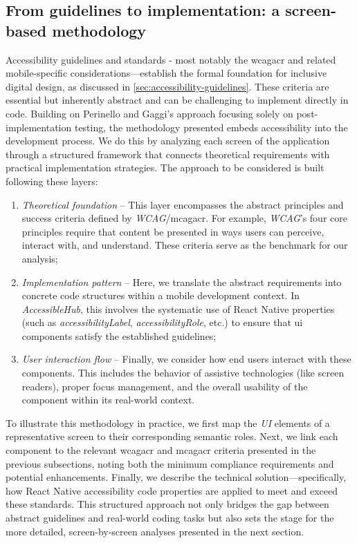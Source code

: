 \subsection{From guidelines to implementation: a screen-based methodology}
\label{sec:accessiblehub-screen-methodology}

Accessibility guidelines and standards - most notably the \acrshort{wcagacr}  and related mobile-specific considerations—establish the formal foundation for inclusive digital design, as discussed in \ref{sec:accessibility-guidelines}. These criteria are essential but inherently abstract and can be challenging to implement directly in code. Building on Perinello and Gaggi's approach focusing solely on post-implementation testing, the methodology presented embeds accessibility into the development process. We do this by analyzing each screen of the application through a structured framework that connects theoretical requirements with practical implementation strategies. The approach to be considered is built following these layers:

\begin{enumerate}
    \item \textit{Theoretical foundation} – This layer encompasses the abstract principles and success criteria defined by \textit{WCAG}/\acrshort{mcagacr}. For example, \textit{WCAG}’s four core principles require that content be presented in ways users can perceive, interact with, and understand. These criteria serve as the benchmark for our analysis;

    \item \textit{Implementation pattern} – Here, we translate the abstract requirements into concrete code structures within a mobile development context. In \textit{AccessibleHub}, this involves the systematic use of React Native properties (such as \textit{accessibilityLabel}, \textit{accessibilityRole}, etc.) to ensure that \acrshort{ui} components satisfy the established guidelines;

    \item \textit{User interaction flow} – Finally, we consider how end users interact with these components. This includes the behavior of assistive technologies (like screen readers), proper focus management, and the overall usability of the component within its real-world context.
\end{enumerate}

To illustrate this methodology in practice, we first map the \textit{UI} elements of a representative screen to their corresponding semantic roles. Next, we link each component to the relevant \acrshort{wcagacr} and \acrshort{mcagacr} criteria presented in the previous subsections, noting both the minimum compliance requirements and potential enhancements. Finally, we describe the technical solution—specifically, how React Native accessibility code properties are applied to meet and exceed these standards. This structured approach not only bridges the gap between abstract guidelines and real-world coding tasks but also sets the stage for the more detailed, screen-by-screen analyses presented in the next section. \\

